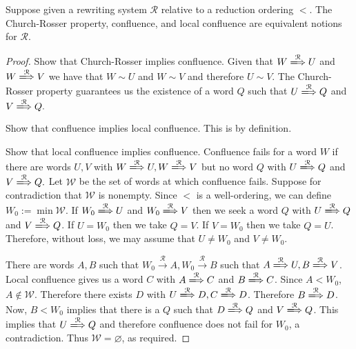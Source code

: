 \begin{thm} \label{CR2} Suppose given a rewriting system $\mathcal{R}$ relative
    to a reduction ordering $<$. The Church-Rosser property, confluence, and
    local confluence are equivalent notions for $\mathcal{R}$.
\end{thm}
\begin{proof} Show that Church-Rosser implies confluence. Given that
    $W\xLongrightarrow{\mathcal{R}} U$ and $W \xLongrightarrow{\mathcal{R}} V$
    we have that $W\sim U$ and $W\sim V$ and therefore $U\sim V$. The
    Church-Rosser property guarantees us the existence of a word $Q$ such that
    $U\xLongrightarrow{\mathcal{R}} Q$ and $V \xLongrightarrow{\mathcal{R}} Q.$

    Show that confluence implies local confluence. This is by definition.

    Show that local confluence implies confluence. Confluence fails for a word
    $W$ if there are words $U,V$ with $W \xLongrightarrow{\mathcal{R}} U, W
    \xLongrightarrow{\mathcal{R}} V$ but no word $Q$ with $U
    \xLongrightarrow{\mathcal{R}} Q$ and $V \xLongrightarrow{\mathcal{R}} Q.$
    Let $\mathcal{W}$ be the set of words at which confluence fails. Suppose
    for contradiction that $\mathcal{W}$ is nonempty. Since $<$ is a
    well-ordering, we can define $W_0 := \min \mathcal{W}$. If $W_0
    \xLongrightarrow{\mathcal{R}} U$ and $W_0 \xLongrightarrow{\mathcal{R}} V$
    then we seek a word $Q$ with $U \xLongrightarrow{\mathcal{R}} Q$ and $V
    \xLongrightarrow{\mathcal{R}} Q$. If $U=W_0$ then we take $Q=V$. If $V=W_0$
    then we take $Q=U$. Therefore, without loss, we may assume that $U\neq W_0$
    and $V\neq W_0$.

    There are words $A,B$ such that $W_0 \xrightarrow{\mathcal{R}} A, W_0
    \xrightarrow{\mathcal{R}} B$ such that $A \xLongrightarrow{\mathcal{R}} U,
    B \xLongrightarrow{\mathcal{R}} V$. Local confluence gives us a word $C$
    with $A \xLongrightarrow{\mathcal{R}} C$ and $B
    \xLongrightarrow{\mathcal{R}} C$. Since $A < W_0$, $A\notin \mathcal{W}$.
    Therefore there exists $D$ with $U \xLongrightarrow{\mathcal{R}} D, C
    \xLongrightarrow{\mathcal{R}} D$. Therefore $B
    \xLongrightarrow{\mathcal{R}} D$. Now, $B < W_0$ implies that there is a
    $Q$ such that $D \xLongrightarrow{\mathcal{R}} Q$ and $V
    \xLongrightarrow{\mathcal{R}} Q$. This implies that $U
    \xLongrightarrow{\mathcal{R}} Q$ and therefore confluence does not fail for
    $W_0$, a contradiction. Thus $\mathcal{W}= \varnothing$, as required.


\end{proof}
